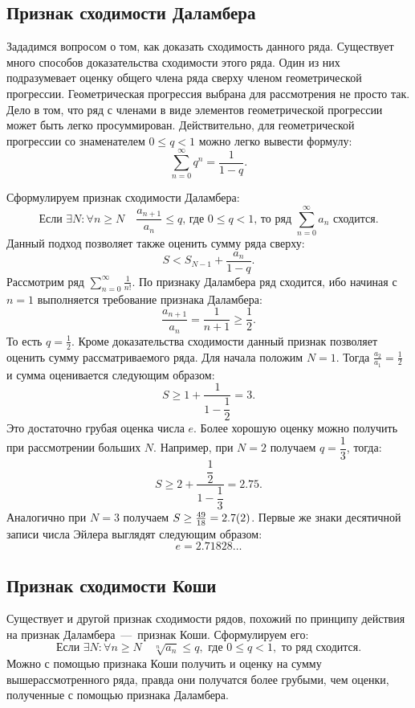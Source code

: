 \documentclass[12pt]{article}
\begin{document}
\subsection{Признак сходимости Даламбера}
Зададимся вопросом о том, как доказать сходимость данного ряда. Существует много способов доказательства сходимости этого ряда. Один из них подразумевает оценку общего члена ряда сверху членом геометрической прогрессии. Геометрическая прогрессия выбрана для рассмотрения не просто так. Дело в том, что ряд с членами в виде элементов геометрической прогрессии может быть легко просуммирован. Действительно, для геометрической прогрессии со знаменателем $0 \le q < 1$ можно легко вывести формулу:
\begin{equation}
    \sum\limits_{n=0}^\infty q^n = \dfrac{1}{1-q}.
\end{equation}
\par
Сформулируем признак сходимости Даламбера:
\begin{equation}
    \text{Если }\exists N: \forall n \ge N \quad \dfrac{a_{n+1}}{a_{n}} \le q \text{, где }0 \le q < 1\text{, то ряд }\sum_{n=0}^\infty a_n\text{ сходится}.
\end{equation}
Данный подход позволяет также оценить сумму ряда сверху:
\begin{equation}
    S < S_{N-1} + \dfrac{a_n}{1-q}.
\end{equation}
Рассмотрим ряд $\sum_{n=0}^\infty \tfrac{1}{n!}$. По признаку Даламбера ряд сходится, ибо начиная с $n=1$ выполняется требование признака Даламбера:
\begin{equation}
    \dfrac{a_{n+1}}{a_n} = \dfrac{1}{n+1} \ge \dfrac{1}{2}.
\end{equation}
То есть $q = \tfrac{1}{2}$. Кроме доказательства сходимости данный признак позволяет оценить сумму рассматриваемого ряда. Для начала положим $N = 1$. Тогда $\tfrac{a_2}{a_1} = \tfrac{1}{2}$ и сумма оценивается следующим образом:
\begin{equation}
    S \ge 1 + \dfrac{1}{1-\dfrac{1}{2}} = 3.
\end{equation}
Это достаточно грубая оценка числа $e$. Более хорошую оценку можно получить при рассмотрении больших $N$. Например, при $N = 2$ получаем $q = \dfrac{1}{3}$, тогда:
\begin{equation}
    S \ge 2 + \dfrac{\dfrac{1}{2}}{1 - \dfrac{1}{3}} = 2.75.
\end{equation}
Аналогично при $N = 3$ получаем $S \ge \tfrac{49}{18} = 2.7\qty(2)$. Первые же знаки десятичной записи числа Эйлера выглядят следующим образом:
$$
e = 2.71828\ldots
$$
\subsection{Признак сходимости Коши}
Существует и другой признак сходимости рядов, похожий по принципу действия на признак Даламбера~\----~признак Коши. Сформулируем его:
\begin{equation}
    \text{Если }\exists N:\forall n\ge N \quad \sqrt[n]{a_n}\le q,\text{ где }0\le q < 1,\text{ то ряд сходится.}
\end{equation}
Можно с помощью признака Коши получить и оценку на сумму вышерассмотренного ряда, правда они получатся более грубыми, чем оценки, полученные с помощью признака Даламбера.
\end{document}
